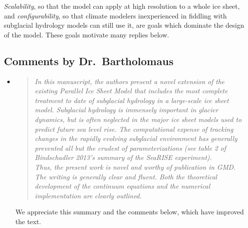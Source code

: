 \documentclass[11pt,reqno]{amsart}
\newcommand{\reply}[2]{
\medskip\medskip
\item  \begin{quote}
\emph{#1}
\end{quote}

\medskip
\noindent #2}
\begin{document}
\emph{Scalability}, so that the model can apply at high resolution to a whole ice sheet, and \emph{configurability}, so that climate modelers inexperienced in fiddling with subglacial hydrology models can still use it, are goals which dominate the design of the model.  These goals motivate many replies below.


\subsection*{Comments by Dr.~Bartholomaus}\begin{itemize}

\reply{In this manuscript, the authors present a novel extension of the existing Parallel Ice Sheet Model that includes the most complete treatment to date of subglacial hydrology in a large-scale ice sheet model.  Subglacial hydrology is immensely important in glacier dynamics, but is often neglected in the major ice sheet models used to predict future sea level rise.  The computational expense of tracking changes in the rapidly evolving subglacial environment has generally prevented all but the crudest of parameterizations (see table 2 of Bindschadler 2013's summary of the SeaRISE experiment).\\
Thus, the present work is novel and worthy of publication in GMD.  The writing is generally clear and fluent.  Both the theoretical development of the continuum equations and the numerical implementation are clearly outlined.}
{We appreciate this summary and the comments below, which have improved the text.}


\end{itemize}
\end{document}

